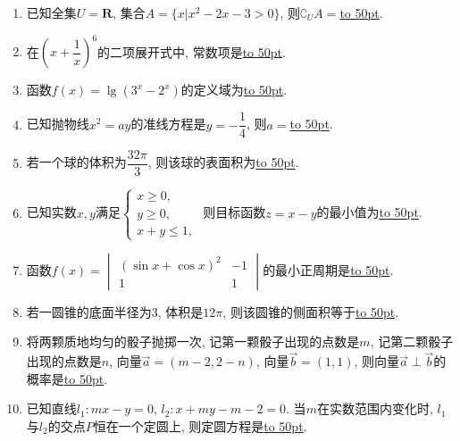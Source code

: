 \documentclass[10pt,a4paper]{article}
\newcommand{\blank}[1]{\underline{\hbox to #1pt{}}}
\begin{document}
\begin{enumerate}[1.]
\item 已知全集$U=\mathbf{R}$, 集合$A=\{x|x^2-2x-3>0\}$, 则$\complement_U A=$\blank{50}. 
\item 在$(x+\dfrac1x)^6$的二项展开式中, 常数项是\blank{50}.
\item 函数$f(x)=\lg (3^x-2^x)$的定义域为\blank{50}.
\item 已知抛物线$x^2=ay$的准线方程是$y=-\dfrac14$, 则$a=$\blank{50}.
\item 若一个球的体积为$\dfrac{32\pi}3$, 则该球的表面积为\blank{50}.
\item 已知实数$x,y$满足$\begin{cases} x\ge 0, \\ y\ge 0, \\ x+y\le 1, \end{cases}$ 则目标函数$z=x-y$的最小值为\blank{50}.
\item 函数$f(x)=\begin{vmatrix} (\sin x+\cos x)^2 & -1 \\ 1 & 1 \end{vmatrix}$的最小正周期是\blank{50}.
\item 若一圆锥的底面半径为$3$, 体积是$12\pi$, 则该圆锥的侧面积等于\blank{50}.
\item 将两颗质地均匀的骰子抛掷一次, 记第一颗骰子出现的点数是$m$, 记第二颗骰子出现的点数是$n$, 向量$\overrightarrow a=(m-2,2-n)$, 向量$\overrightarrow b=(1,1)$, 则向量$\overrightarrow a\perp \overrightarrow b$的概率是\blank{50}.
\item 已知直线$l_1:mx-y=0$, $l_2:x+my-m-2=0$. 当$m$在实数范围内变化时, $l_1$与$l_2$的交点$P$恒在一个定圆上, 则定圆方程是\blank{50}.



\end{enumerate}
\end{document}
